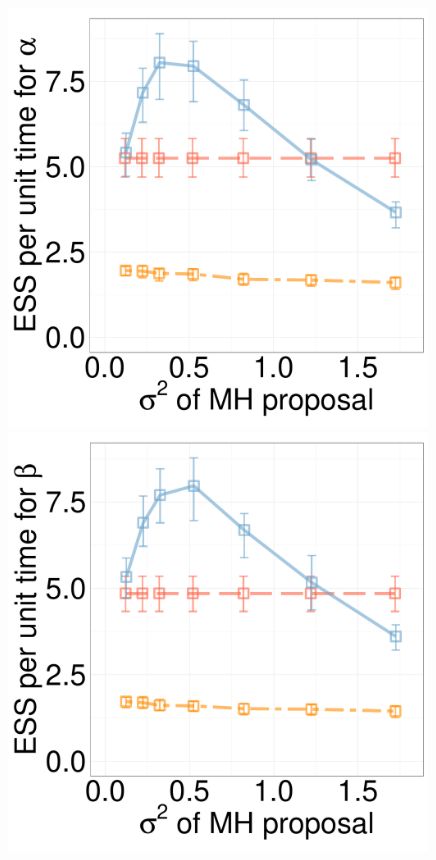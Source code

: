   \begin{figure}[H]
  \centering
  \begin{minipage}[!hp]{0.24\linewidth}
    \includegraphics [width=0.99\textwidth, angle=0]{figs/new_experiment_figs/q_alpha_dim3_k2.pdf}
\end{minipage}
  \begin{minipage}[hp]{0.24\linewidth}
  \centering
    \includegraphics [width=0.99\textwidth, angle=0]{figs/new_experiment_figs/q_beta_dim3_k2.pdf}

\end{minipage}
\end{figure}

